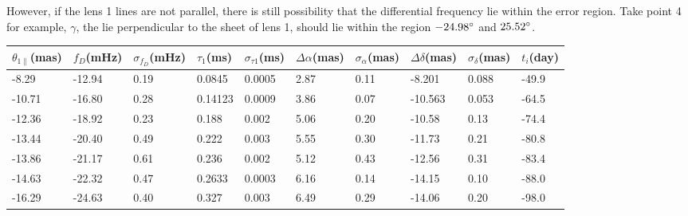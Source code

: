 \documentclass[useAMS,usenatbib]{mn2e}
\begin{document}
However, if the lens 1 lines are not parallel, there is still possibility that the differential frequency lie within the error region. Take point 4 for example, $\gamma$, the lie perpendicular to the sheet of lens 1, should lie within the region $-24.98 \degree$ and $\-25.52 \degree$.

\begin{table}
\centering
\begin{tabular}{llllllllll}
\hline
$\theta_{1\parallel}$(mas) &$f_D$(mHz) & $\sigma_{f_D}$(mHz) & $\tau_1$(ms) & $\sigma_{\tau1}$(ms) & $\Delta\alpha$(mas) & $\sigma_{\alpha}$(mas) & $\Delta\delta$(mas) & $\sigma_{\delta}$(mas) & $t_i$(day)\\
\hline
 -8.29   & -12.94                            & 0.19      & 0.0845  & 0.0005          & 2.87    & 0.11                                     & -8.201     & 0.088      & -49.9                                \\

-10.71   &-16.80                             & 0.28      & 0.14123 & 0.0009         & 3.86    & 0.07                                     & -10.563    & 0.053      &-64.5                                \\

-12.36   &-18.92                            & 0.23      & 0.188   & 0.002           & 5.06    & 0.20                                      & -10.58    & 0.13      &-74.4                        \\

-13.44 & -20.40                             & 0.49      & 0.222   & 0.003           & 5.55    & 0.30                                      & -11.73    & 0.21      &-80.8                                \\

-13.86 &-21.17                            & 0.61      & 0.236   & 0.002           & 5.12    & 0.43                                     & -12.56    & 0.31      &-83.4                                \\

-14.63   &-22.32                            & 0.47      & 0.2633  & 0.0003          & 6.16    & 0.14                                     & -14.15    & 0.10       &-88.0                                \\

-16.29   &-24.63                            & 0.40       & 0.327  & 0.003          & 6.49    & 0.29                                     & -14.06    & 0.20       &-98.0                                \\


\end{tabular}
\end{table}
\end{document}
